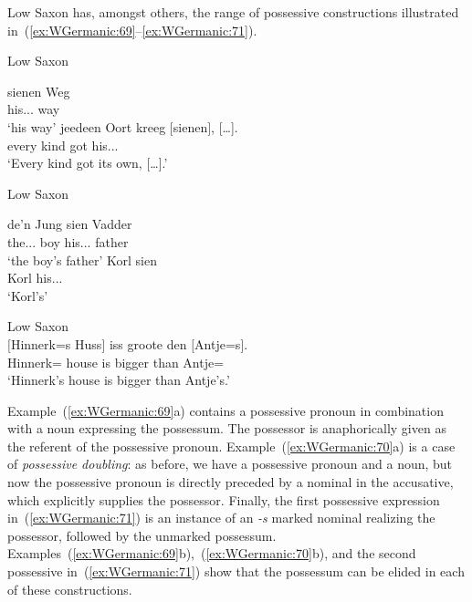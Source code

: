 \documentclass[output=paper,hidelinks]{langscibook}
\begin{document}
Low Saxon has, amongst others, the range of possessive constructions illustrated in~(\ref{ex:WGermanic:69}--\ref{ex:WGermanic:71}).
%
\begin{exe}
  \ex\label{ex:WGermanic:69} Low Saxon \citep[§2.2, examples~2.52 and~2.84]{strunk04}
    \begin{xlist}
      \ex \gll sienen Weg\\
               his.\M.\SG.\ACC{} way\\
          \glt `his way'
      \ex \gll jeedeen Oort kreeg $[$sienen$]$, [\ldots].\\
                every kind got \phantom{$[$}his.\M.\SG.\ACC{}\\
           \glt `Every kind got its own, [\ldots].'
    \end{xlist}
  \ex\label{ex:WGermanic:70} Low Saxon \citep[§2.3, examples~2.112 and~2.177]{strunk04}
    \begin{xlist}
      \ex \gll de'n Jung sien Vadder\\
               the.\M.\SG.\ACC{} boy his.\M.\SG.\NOM{} father\\
      \glt `the boy's father'
    \ex \gll Korl sien\\
             Korl his.\N.\SG.\NOM{}\\
             \glt `Korl's'
               \end{xlist}
  \ex\label{ex:WGermanic:71} Low Saxon \citep[§6, example~61]{Strunk05}\label{ex:lowsaxonprenomgen}\\
    \gll $[$Hinnerk=s Huss$]$ iss groote den $[$Antje=s$]$.\\
             \phantom{$[$}Hinnerk=\POSS{} house is bigger than \phantom{$[$}Antje=\POSS{}\\
        \glt `Hinnerk's house is bigger than Antje's.'
\end{exe}
%
Example~(\ref{ex:WGermanic:69}a) contains a possessive pronoun in combination with
a noun expressing the possessum. The possessor is anaphorically given
as the referent of the possessive pronoun. Example~(\ref{ex:WGermanic:70}a) is a
case of \textit{possessive doubling}: as before, we have a possessive
pronoun and a noun, but now the possessive pronoun is directly
preceded by a nominal in the accusative, which explicitly supplies the
possessor. Finally, the first possessive expression in~(\ref{ex:WGermanic:71}) is
an instance of an \textit{-s} marked nominal realizing the possessor,
followed by the unmarked possessum. Examples~(\ref{ex:WGermanic:69}b),~(\ref{ex:WGermanic:70}b),
and the second possessive in~(\ref{ex:WGermanic:71}) show that the possessum can be
elided in each of these constructions.
\end{document}
